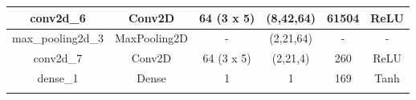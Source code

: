 \begin{table}[!h]
{\begin{tabular}{@{}cccccc@{}}
            \multicolumn{1}{|c|}{conv2d\_6}         & \multicolumn{1}{c|}{Conv2D}        & \multicolumn{1}{c|}{64 (3 x 5)}                                                            & \multicolumn{1}{c|}{(8,42,64)}                                                                 & \multicolumn{1}{c|}{61504}                                                                      & \multicolumn{1}{c|}{ReLU}                                                                      \\ \midrule
            \multicolumn{1}{|c|}{max\_pooling2d\_3} & \multicolumn{1}{c|}{MaxPooling2D}  & \multicolumn{1}{c|}{-}                                                                     & \multicolumn{1}{c|}{(2,21,64)}                                                                 & \multicolumn{1}{c|}{-}                                                                          & \multicolumn{1}{c|}{-}                                                                         \\ \midrule
            \multicolumn{1}{|c|}{conv2d\_7}         & \multicolumn{1}{c|}{Conv2D}        & \multicolumn{1}{c|}{64 (3 x 5)}                                                            & \multicolumn{1}{c|}{(2,21,4)}                                                                  & \multicolumn{1}{c|}{260}                                                                        & \multicolumn{1}{c|}{ReLU}                                                                      \\ \midrule
            \multicolumn{1}{|c|}{dense\_1}          & \multicolumn{1}{c|}{Dense}         & \multicolumn{1}{c|}{1}                                                                     & \multicolumn{1}{c|}{1}                                                                         & \multicolumn{1}{c|}{169}                                                                        & \multicolumn{1}{c|}{Tanh}                                                                      \\ \midrule
                                                    &                                    &                                                                                            &                                                                                                &                                                                                                 &                                                                                                \\ \cmidrule(l){3-6} 

\end{tabular}}
\end{table}
